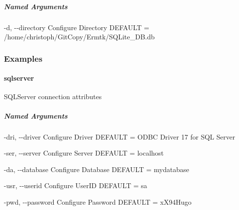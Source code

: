 \documentclass[letterpaper,10pt,english,openany,oneside]{sphinxmanual}
\begin{document}
\subparagraph{Named Arguments}
\label{\detokenize{cmd_main:Named Arguments_repeat14}}\begin{optionlist}{3cm}
\item [-d, -{-}directory]  
Configure Directory DEFAULT = /home/christoph/GitCopy/Ermtk/SQLite\_DB.db
\end{optionlist}

\subsubsection{Examples}

\begin{sphinxVerbatim}[commandchars=\\\{\}]
    
\end{sphinxVerbatim}

\paragraph{sqlserver}
\label{\detokenize{cmd_main:sqlserver}}
SQLServer connection attributes

\begin{sphinxVerbatim}[commandchars=\\\{\}]
   \PYG{p}{[}\PYG{p}{]} \PYG{p}{[} \PYG{p}{]} \PYG{p}{[} \PYG{p}{]} \PYG{p}{[} \PYG{p}{]}
                       \PYG{p}{[} \PYG{p}{]} \PYG{p}{[} \PYG{p}{]}
\end{sphinxVerbatim}


\subparagraph{Named Arguments}
\label{\detokenize{cmd_main:Named Arguments_repeat15}}\begin{optionlist}{3cm}
\item [-dri, -{-}driver]  
Configure Driver DEFAULT = ODBC Driver 17 for SQL Server
\item [-ser, -{-}server]  
Configure Server DEFAULT = localhost
\item [-da, -{-}database]  
Configure Database DEFAULT = mydatabase
\item [-usr, -{-}userid]  
Configure UserID DEFAULT = sa
\item [-pwd, -{-}password]  
Configure Password DEFAULT = xX94Hugo
\end{optionlist}
\end{document}
